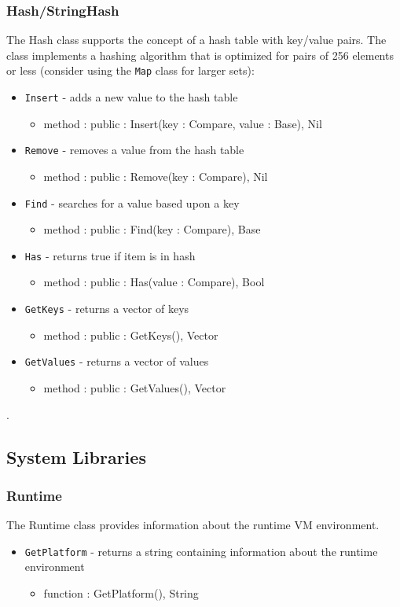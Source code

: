 \documentclass[12pt]{article}
\begin{document}
\subsubsection{Hash/StringHash}
The Hash class supports the concept of a hash table with key/value pairs.  The class implements a hashing algorithm that is optimized for pairs of 256 elements or less  (consider using the \texttt{Map} class for larger sets):
\begin{itemize}
\item \texttt{Insert} - adds a new value to the hash table
  \begin{itemize}
  \item method : public : Insert(key : Compare, value : Base), Nil
  \end{itemize}
\item \texttt{Remove} - removes a value from the hash table
  \begin{itemize}
  \item method : public : Remove(key : Compare), Nil
  \end{itemize}
\item \texttt{Find} - searches for a value based upon a key
  \begin{itemize}
  \item method : public : Find(key : Compare), Base
  \end{itemize}
\item \texttt{Has} - returns true if item is in hash
  \begin{itemize}
  \item method : public : Has(value : Compare), Bool
  \end{itemize}
\item \texttt{GetKeys} - returns a vector of keys
  \begin{itemize}
  \item method : public : GetKeys(), Vector
  \end{itemize}
\item \texttt{GetValues} - returns a vector of values
  \begin{itemize}
  \item method : public : GetValues(), Vector
  \end{itemize}
\end{itemize}.

\subsection{System Libraries}
\subsubsection{Runtime}
The Runtime class provides information about the runtime VM environment.
\begin{itemize}
\item \texttt{GetPlatform} - returns a string containing information
  about the runtime environment
  \begin{itemize}
  \item function : GetPlatform(), String
  \end{itemize}
\end{itemize}
\end{document}
